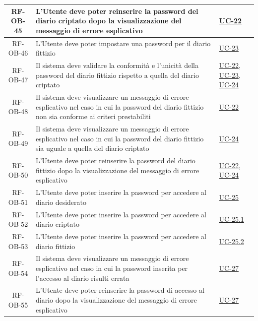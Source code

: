 \documentclass[a4paper,12pt]{article}
\begin{document}
\begin{center}
\begin{longtable}{|c|p{8.5cm}|>{\centering\arraybackslash}p{4cm}|}
RF-OB-45 & L'Utente deve poter reinserire la password del diario criptato dopo la visualizzazione del messaggio di errore esplicativo & \hyperref[subsec:UC-22]{UC-22} \\
\hline

RF-OB-46 & L'Utente deve poter impostare una password per il diario fittizio & \hyperref[subsec:UC-23]{UC-23} \\
\hline

RF-OB-47 & Il sistema deve validare la conformità e l'unicità della password del diario fittizio rispetto a quella del diario criptato & \hyperref[subsec:UC-22]{UC-22}, \hyperref[subsec:UC-23]{UC-23}, \hyperref[subsec:UC-24]{UC-24} \\
\hline

RF-OB-48 & Il sistema deve visualizzare un messaggio di errore esplicativo nel caso in cui la password del diario fittizio non sia conforme ai criteri prestabiliti & \hyperref[subsec:UC-22]{UC-22} \\
\hline

RF-OB-49 & Il sistema deve visualizzare un messaggio di errore esplicativo nel caso in cui la password del diario fittizio sia uguale a quella del diario criptato & \hyperref[subsec:UC-24]{UC-24} \\
\hline

RF-OB-50 & L'Utente deve poter reinserire la password del diario fittizio dopo la visualizzazione del messaggio di errore esplicativo & \hyperref[subsec:UC-22]{UC-22}, \hyperref[subsec:UC-24]{UC-24} \\
\hline

RF-OB-51 & L'Utente deve poter inserire la password per accedere al diario desiderato & \hyperref[subsec:UC-25]{UC-25} \\
\hline

RF-OB-52 & L'Utente deve poter inserire la password per accedere al diario criptato & \hyperref[subsec:UC-25.1]{UC-25.1} \\
\hline

RF-OB-53 & L'Utente deve poter inserire la password per accedere al diario fittizio & \hyperref[subsec:UC-25.2]{UC-25.2} \\
\hline

RF-OB-54 & Il sistema deve visualizzare un messaggio di errore esplicativo nel caso in cui la password inserita per l'accesso al diario risulti errata & \hyperref[subsec:UC-27]{UC-27} \\
\hline

RF-OB-55 & L'Utente deve poter reinserire la password di accesso al diario dopo la visualizzazione del messaggio di errore esplicativo & \hyperref[subsec:UC-27]{UC-27} \\
\hline


\end{longtable}
\end{center}
\end{document}
